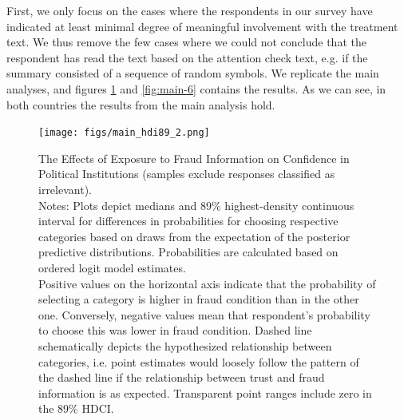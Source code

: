 \documentclass[11pt, ngerman,english,a4]{article}
\begin{document}
% 

% 

First, we only focus on the cases where the respondents in our survey have indicated at least minimal degree of meaningful involvement with the treatment text. We thus remove the few cases where we could not conclude that the respondent has read the text based on the attention check text, e.g. if the summary consisted of a sequence of random symbols. We replicate the main analyses, and figures \ref{fig:main-2} and \ref{fig:main-6} contains the results. As we can see, in both countries the results from the main analysis hold. 

\begin{figure}[H]
	\centering
	\texttt{[image: figs/main\_hdi89\_2.png]}
	\caption{The Effects of Exposure to Fraud Information on Confidence in Political Institutions (samples exclude responses classified as irrelevant).  \\
		\footnotesize{Notes: Plots depict medians and 89\% highest-density continuous interval for differences in probabilities for choosing respective categories based on draws from the expectation of the posterior predictive distributions. Probabilities are calculated based on ordered logit model estimates.\\
			Positive values on the horizontal axis indicate that the probability of selecting a category is higher in fraud condition than in the other one. Conversely, negative values mean that respondent's probability to choose this was lower in fraud condition. Dashed line schematically depicts the hypothesized relationship between categories, i.e. point estimates would loosely follow the pattern of the dashed line if the relationship between trust and fraud information is as expected. Transparent point ranges include zero in the 89\% HDCI.\\
	} }
	\singlespacing
	\raggedright
	\label{fig:main-2}
\end{figure}
    
\end{document}
